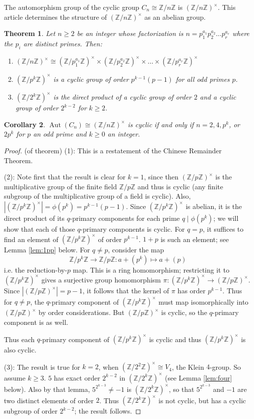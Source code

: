 \documentclass[12pt]{article}
\newcommand{\Ints}{\mathbb{Z}}
\DeclareMathOperator{\Aut}{Aut}
\newcommand{\UI}[1]{(\Ints/{#1}\Ints)^{\times}}
\newcommand{\Order}[1]{\left\lvert #1 \right\rvert}
\newtheorem{thm}{Theorem}
\newtheorem{cor}[thm]{Corollary}
\begin{document}
The automorphism group of the cyclic group $C_n\cong \Ints/n\Ints$ is $\UI{n}$. This article determines the structure of $\UI{n}$ as an abelian group.

\begin{thm} Let $n\geq 2$ be an integer whose factorization is $n=p_1^{a_1}p_2^{a_2}\dots  p_r^{a_r}$ where the $p_i$ are distinct primes. Then:
\begin{enumerate}
\item $\UI{n} \cong \UI{p_1^{a_1}}\times \UI{p_2^{a_2}}\times \dots \times \UI{p_r^{a_r}}$
\item $\UI{p^k}$ is a cyclic group of order $p^{k-1}(p-1)$ for all odd primes $p$.
\item $\UI{2^k}$ is the direct product of a cyclic group of order $2$ and a cyclic group of order $2^{k-2}$ for $k\geq 2$.
\end{enumerate}
\end{thm}
\begin{cor} $\Aut(C_n)\cong \UI{n}$ is cyclic if and only if $n=2, 4, p^k$, or $2p^k$ for $p$ an odd prime and $k\geq 0$ an integer.
\end{cor}

\begin{proof}(of theorem)
\newline
(1): This is a restatement of the Chinese Remainder Theorem.

(2): Note first that the result is clear for $k=1$, since then $\UI{p}$ is the multiplicative group of the finite field $\Ints/p\Ints$ and thus is cyclic (any finite subgroup of the multiplicative group of a field is cyclic). Also, $\Order{\UI{p^k}} = \phi(p^k) = p^{k-1}(p-1)$. Since $\UI{p^k}$ is abelian, it is the direct product of its $q$-primary components for each prime $q\mid \phi(p^k)$; we will show that each of those $q$-primary components is cyclic. For $q=p$, it suffices to find an element of $\UI{p^k}$ of order $p^{k-1}$. $1+p$ is such an element; see Lemma \ref{lem:1pp} below. For $q\neq p$, consider the map
\[
  \Ints/p^k\Ints \to \Ints/p\Ints : a + (p^k) \mapsto a+(p)
\]
i.e. the reduction-by-$p$ map. This is a ring homomorphism; restricting it to $\UI{p^k}$ gives a surjective group homomorphism $\pi:\UI{p^k}\to \UI{p}$. Since $\Order{\UI{p}}=p-1$, it follows that the kernel of $\pi$ has order $p^{k-1}$. Thus for $q\neq p$, the $q$-primary component of $\UI{p^k}$ must map isomorphically into $\UI{p}$ by order considerations. But $\UI{p}$ is cyclic, so the $q$-primary component is as well.

Thus each $q$-primary component of $\UI{p^k}$ is cyclic and thus $\UI{p^k}$ is also cyclic.

(3): The result is true for $k=2$, when $\UI{2^2}\cong V_4$, the Klein $4$-group. So assume $k\geq 3$. $5$ has exact order $2^{k-2}$ in $\UI{2^k}$ (see Lemma \ref{lem:four} below). Also by that lemma, $5^{2^{k-3}}\neq -1$ is $\UI{2^k}$, so that $5^{2^{k-3}}$ and $-1$ are two distinct elements of order $2$. Thus $\UI{2^k}$ is not cyclic, but has a cyclic subgroup of order $2^{k-2}$; the result follows.
\end{proof}
\end{document}
